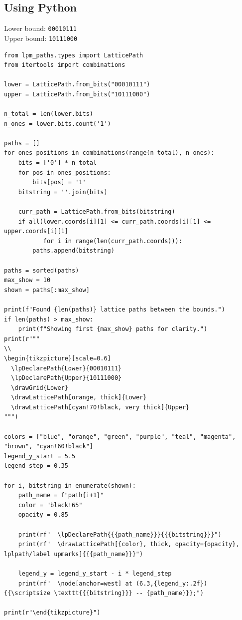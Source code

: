 \documentclass{article}
\begin{document}
\subsection{Using Python}
Lower bound: \texttt{00010111} \\
Upper bound: \texttt{10111000}
\begin{verbatim}
from lpm_paths.types import LatticePath
from itertools import combinations

lower = LatticePath.from_bits("00010111")
upper = LatticePath.from_bits("10111000")

n_total = len(lower.bits)
n_ones = lower.bits.count('1')

paths = []
for ones_positions in combinations(range(n_total), n_ones):
    bits = ['0'] * n_total
    for pos in ones_positions:
        bits[pos] = '1'
    bitstring = ''.join(bits)

    curr_path = LatticePath.from_bits(bitstring)
    if all(lower.coords[i][1] <= curr_path.coords[i][1] <= upper.coords[i][1]
           for i in range(len(curr_path.coords))):
        paths.append(bitstring)

paths = sorted(paths)
max_show = 10
shown = paths[:max_show]

print(f"Found {len(paths)} lattice paths between the bounds.")
if len(paths) > max_show:
    print(f"Showing first {max_show} paths for clarity.")
print(r"""
\\
\begin{tikzpicture}[scale=0.6]
  \lpDeclarePath{Lower}{00010111}
  \lpDeclarePath{Upper}{10111000}
  \drawGrid{Lower}
  \drawLatticePath[orange, thick]{Lower}
  \drawLatticePath[cyan!70!black, very thick]{Upper}
""")

colors = ["blue", "orange", "green", "purple", "teal", "magenta", "brown", "cyan!60!black"]
legend_y_start = 5.5
legend_step = 0.35

for i, bitstring in enumerate(shown):
    path_name = f"path{i+1}"
    color = "black!65"
    opacity = 0.85

    print(rf"  \lpDeclarePath{{{path_name}}}{{{bitstring}}}")
    print(rf"  \drawLatticePath[{color}, thick, opacity={opacity}, lplpath/label upmarks]{{{path_name}}}")

    legend_y = legend_y_start - i * legend_step
    print(rf"  \node[anchor=west] at (6.3,{legend_y:.2f}) {{\scriptsize \texttt{{{bitstring}}} -- {path_name}}};")

print(r"\end{tikzpicture}")
\end{verbatim}
\end{document}
